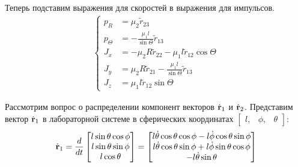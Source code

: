 Теперь подставим выражения для скоростей в выражения для импульсов.
\begin{gather}
\left\{
\begin{aligned}
p_R &= \mu_2 \tilde{r}_{23}\\
p_{\Theta} &= -\frac{\mu_1 l}{\sin\Theta}\tilde{r}_{13} \\
J_x &= -\mu_2 R \tilde{r}_{22} - \mu_1 l \tilde{r}_{12} \cos \Theta \\
J_y &= \mu_2 R \tilde{r}_{21} - \frac{\mu_1 l}{\sin \Theta}\tilde{r}_{13} \\
J_z &= \mu_1 l\tilde{r}_{12} \sin \Theta
\end{aligned}
\right.
\end{gather}

Рассмотрим вопрос о распределении компонент векторов $\dot{\mathbf{r}}_1$ и $\dot{\mathbf{r}}_2$. 
Представим вектор $\dot{\mathbf{r}}_1$ в лабораторной системе в сферических координатах $\begin{bmatrix} l, & \phi, & \theta \end{bmatrix}$: 
\begin{gather}
\dot{\mathbf{r}}_1 = \frac{d}{dt}
\begin{bmatrix}
l \sin \theta \cos \phi\\
l \sin \theta \sin \phi\\
l\cos \theta
\end{bmatrix}
=
\begin{bmatrix} 
l \dot{\theta} \cos\theta \cos\phi  - l \dot{\phi} \cos\theta \sin\phi \\ 
l \dot{\theta} \cos\theta \sin\phi + l \dot{\phi} \sin\theta \cos\phi \\ 
 -l \dot{\theta} \sin \theta 
\end{bmatrix} \notag 
\end{gather}

